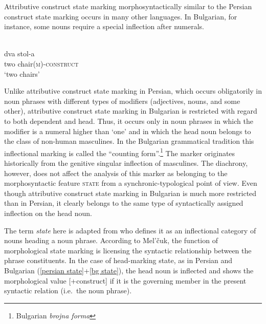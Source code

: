 Attributive construct state marking morphosyntactically similar to the Persian construct state marking occurs in many other languages. In Bulgarian, for instance, some nouns require a special inflection after numerals.
\begin{exe}
\ex 
{}\\
\label{bg state}
\gll 	dva 	stol-a\\
	two	chair{\textsc{(m)-construct}}\\
\glt 	‘two chairs’
\end{exe}
Unlike attributive construct state marking in Persian, which occurs obligatorily in noun phrases with different types of modifiers (adjectives, nouns, and some other), attributive construct state marking in Bulgarian is restricted with regard to both dependent and head. Thus, it occurs only in noun phrases in which the modifier is a numeral higher than ‘one’ and in which the head noun belongs to the class of non-human masculines. In the Bulgarian grammatical tradition this inflectional marking is called the “counting form”.\footnote{Bulgarian \emph{brojna forma}} The marker originates historically from the genitive singular inflection of masculines. The diachrony, however, does not affect the analysis of this marker as belonging to the morphosyntactic feature \textsc{state} from a synchronic-typological point of view. Even though attributive construct state marking in Bulgarian is much more restricted than in Persian, it clearly belongs to the same type of syntactically assigned inflection on the head noun.

The term \emph{state} here is adapted from \citet[114–116]{melcuk2006} who defines it as an inflectional category of nouns heading a noun phrase. According to Mel'čuk, the function of morphological state marking is licensing the syntactic relationship between the phrase constituents. In the case of head-marking state, as in Persian and Bulgarian (\ref{persian state}+\ref{bg state}), the head noun is inflected and shows the morphological value [+construct] if it is the governing member in the present syntactic relation (i.e.~the noun phrase). 


